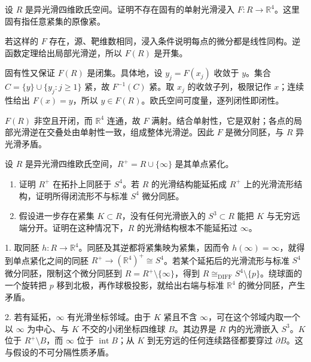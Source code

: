 \begin{exercise}\label{g2:ex:exotic-r-four-proper-coordinate}
	设 \(R\) 是异光滑四维欧氏空间。证明不存在固有的单射光滑浸入 \(F\colon R\rightarrow\mathbb R^4\)。这里固有指任意紧集的原像紧。
\end{exercise}
\begin{solution}
	若这样的 \(F\) 存在，源、靶维数相同，浸入条件说明每点的微分都是线性同构。逆函数定理给出局部光滑逆，所以 \(F(R)\) 是开集。

	固有性又保证 \(F(R)\) 是闭集。具体地，设 \(y_j=F(x_j)\) 收敛于 \(y\)。集合 \(C=\{y\}\cup\{y_j:j\ge1\}\) 紧，故 \(F^{-1}(C)\) 紧。取 \(x_j\) 的收敛子列，极限记作 \(x\)；连续性给出 \(F(x)=y\)，所以 \(y\in F(R)\)。欧氏空间可度量，逐列闭性即闭性。

	\(F(R)\) 非空且开闭，而 \(\mathbb R^4\) 连通，故 \(F\) 满射。结合单射性，它是双射；各点的局部光滑逆在交叠处由单射性一致，组成整体光滑逆。因此 \(F\) 是微分同胚，与 \(R\) 异光滑矛盾。
\end{solution}

\begin{exercise}\label{g2:ex:exotic-r-four-one-point}
	设 \(R\) 是异光滑四维欧氏空间，\(R^+=R\cup\{\infty\}\) 是其单点紧化。
	\begin{enumerate}
		\item 证明 \(R^+\) 在拓扑上同胚于 \(S^4\)。若 \(R\) 的光滑结构能延拓成 \(R^+\) 上的光滑流形结构，证明所得闭流形不与标准 \(S^4\) 微分同胚。
		\item 假设进一步存在紧集 \(K\subset R\)，没有任何光滑嵌入的 \(S^3\subset R\) 能把 \(K\) 与无穷远端分开。证明在这种情况下，\(R\) 的光滑结构根本不能延拓过 \(\infty\)。
	\end{enumerate}
\end{exercise}
\begin{solution}
	1. 取同胚 \(h\colon R\rightarrow\mathbb R^4\)。同胚及其逆都将紧集映为紧集，因而令 \(h(\infty)=\infty\)，就得到单点紧化之间的同胚 \(R^+\rightarrow(\mathbb R^4)^+\cong S^4\)。若某个延拓后的光滑流形与标准 \(S^4\) 微分同胚，限制这个微分同胚到 \(R=R^+\setminus\{\infty\}\)，得到 \(R\cong_{\mathrm{DIFF}}S^4\setminus\{p\}\)。绕球面的一个旋转把 \(p\) 移到北极，再作球极投影，就给出右端与标准 \(\mathbb R^4\) 的微分同胚，产生矛盾。

	2. 若有延拓，\(\infty\) 有光滑坐标邻域。由于 \(K\) 紧且不含 \(\infty\)，可在这个邻域内取一个以 \(\infty\) 为中心、与 \(K\) 不交的小闭坐标四维球 \(B\)。其边界是 \(R\) 内的光滑嵌入 \(S^3\)。\(K\) 位于 \(R^+\setminus B\)，而 \(\infty\) 位于 \(\operatorname{int}B\)；从 \(K\) 到无穷远的任何连续路径都要穿过 \(\partial B\)。这与假设的不可分隔性质矛盾。
\end{solution}
